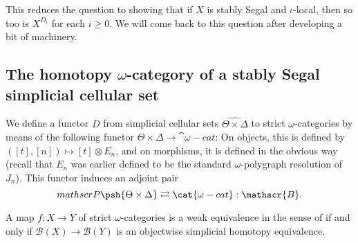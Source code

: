 This reduces the question to showing that if \(X\) is stably Segal and \(\iota\)-local, then so too is \(X^{D_i}\) for each \(i\geq 0\).  We will come back to this question after developing a bit of machinery.
\subsection{The homotopy $\omega$-category of a stably Segal simplicial cellular set}
We define a functor \(D\) from simplicial cellular sets \(\widehat{\Theta\times\Delta}\) to strict \(\omega\)-categories  by means of the following functor \(\Theta\times\Delta\to \cat{\omega}-cat\):  On objects, this is defined by \(([t],[n])\mapsto [t]\otimes E_n\), and on morphisms, it is defined in the obvious way (recall that \(E_n\) was earlier defined to be the standard \(\omega\)-polygraph resolution of \(J_n\)).  This functor induces an adjoint pair \[mathscr{P}\psh{\Theta\times \Delta}\rightleftarrows \cat{\omega-cat}:\mathscr{B}.\] 
\begin{thm} A map \(f:X\to Y\) of strict \(\omega\)-categories is a weak equivalence in the sense of \cite{lmw} if and only if \(\mathscr{B}(X)\to \mathscr{B}(Y)\) is an objectwise simplicial homotopy equivalence.
\end{thm}
